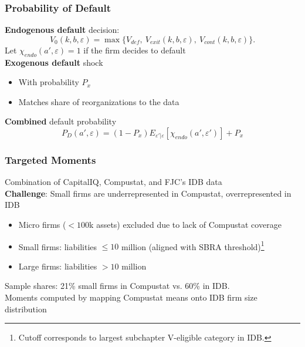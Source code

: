 \documentclass[aspectratio=169,xcolor=table]{beamer}
\begin{document}
\begin{frame}[label=Default] \frametitle{Probability of Default \hfill \hyperlink{LiqReorg}{}}
\textbf{Endogenous default} decision:
\begin{equation*} \label{eq:default decision2}
    V_0(k,b,\varepsilon) = \max \{V_{def}, \  V_{exit}(k,b,\varepsilon),  \ V_{cont}(k,b,\varepsilon) \}.
\end{equation*}
Let $\chi_{endo}(a', \varepsilon) = 1$ if the firm decides to default \vspace{3mm} \\

\textbf{Exogenous default} shock 
\begin{itemize} \small
    \item With probability $P_{x}$
    \item Matches share of reorganizations to the data
\end{itemize} \normalsize

\textbf{Combined} default probability 
$$  P_D(a', \varepsilon) = (1-P_x)E_{\varepsilon'|\varepsilon}[\chi_{endo}(a',\varepsilon')] + P_{x}  $$


\end{frame}


\begin{frame}[label=targets] \frametitle{Targeted Moments \hfill \hyperlink{datasources}{}}
 
Combination of CapitalIQ, Compustat, and FJC's IDB data \vspace{3mm} \\
\textbf{Challenge}: Small firms are underrepresented in Compustat, overrepresented in IDB
\begin{itemize}
    \item Micro firms ($<100$k assets) excluded due to lack of Compustat coverage
    \item Small firms: liabilities $\leq 10$ million (aligned with SBRA threshold)\footnote{Cutoff corresponds to largest subchapter V-eligible category in IDB.}
    \item Large firms: liabilities $ > 10$ million
\end{itemize}
Sample shares: 21\% small firms in Compustat vs. 60\% in IDB. \vspace{3mm} \\
Moments computed by mapping Compustat means onto IDB firm size distribution


\end{frame}
\end{document}
